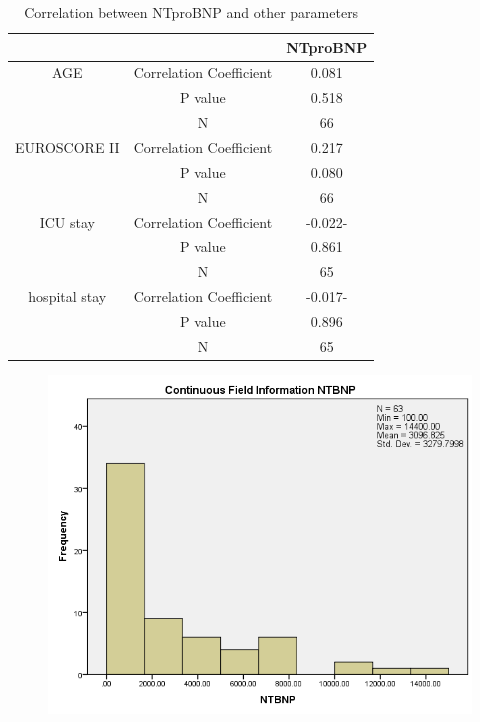 \documentclass[14pt,a4paper,onecolumn]{extarticle}
\begin{document}
\begin{table}[]
\centering
\caption{Correlation between NTproBNP and other parameters}
\label{Result_correl_parameters}
\begin{tabular}{ccc}
    \hline
                 &                         & NTproBNP \\\hline
AGE              & Correlation Coefficient & 0.081     \\
                 & P value                 & 0.518     \\
                 & N                       & 66       \\
EUROSCORE II     & Correlation Coefficient & 0.217     \\
                 & P value                 & 0.080     \\
                 & N                       & 66       \\
ICU stay         & Correlation Coefficient & -0.022-   \\
                 & P value                 & 0.861     \\
                 & N                       & 65       \\
hospital stay & Correlation Coefficient & -0.017-   \\
                 & P value                 & 0.896     \\
                 & N                       & 65

\end{tabular}
\end{table}

\clearpage
\begin{figure}
    \centering
    \includegraphics[scale=0.7]{./images/cont_ntprobnp.png}
    \caption{}
    \label{}
\end{figure}
\end{document}
